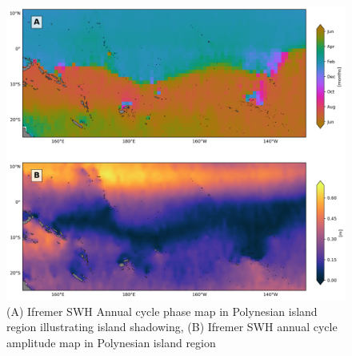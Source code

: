 \documentclass[draft,linenumbers]{agujournal2018}
\begin{document}

\begin{figure}[htb]
\centering
\includegraphics[width=1.0\textwidth]{figs/lsf_parameters/Phase_amp_topography_overlap.png}
\caption{(A) Ifremer SWH Annual cycle phase map in Polynesian island region illustrating island shadowing, (B) Ifremer SWH annual cycle amplitude map in Polynesian island region }
\label{phase_amp_topo_comp}
\end{figure}
\end{document}
